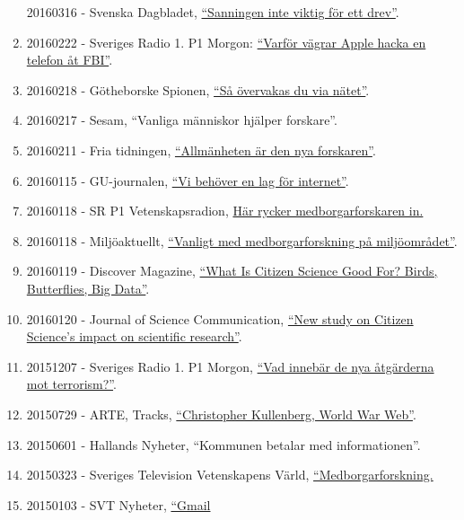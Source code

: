 \documentclass[
]{article}
\begin{document}
\begin{enumerate}
  20160316 - Svenska Dagbladet,
  \href{http://www.svd.se/sanning-inte-viktigt-for-ett-drev/om/natdrev}{``Sanningen
  inte viktig för ett drev''}.
\item
  20160222 - Sveriges Radio 1. P1 Morgon:
  \href{http://t.sr.se/1KBHSak}{``Varför vägrar Apple hacka en telefon
  åt FBI''}.
\item
  20160218 - Götheborske Spionen,
  \href{http://www.spionen.se/140-redaktionellt/reportage/feature/1593-sa-oevervakas-du-via-naetet}{``Så
  övervakas du via nätet''}.
\item
  20160217 - Sesam, ``Vanliga människor hjälper forskare''.
\item
  20160211 - Fria tidningen,
  \href{http://www.fria.nu/artikel/121724}{``Allmänheten är den nya
  forskaren''}.
\item
  20160115 - GU-journalen,
  \href{https://issuu.com/universityofgothenburg/docs/guj1-2016/32}{``Vi
  behöver en lag för internet''}.
\item
  20160118 - SR P1 Vetenskapsradion, \href{http://t.sr.se/239vggG}{Här
  rycker medborgarforskaren in.}
\item
  20160118 - Miljöaktuellt,
  \href{http://miljoaktuellt.se/vanligare-att-forskare-tar-hjalp-av-allmanheten/}{``Vanligt
  med medborgarforskning på miljöområdet''}.
\item
  20160119 - Discover Magazine,
  \href{http://blogs.discovermagazine.com/inkfish/2016/01/19/what-is-citizen-science-good-for-birds-butterflies-big-data/\#.Vp9DvPGFB24}{``What
  Is Citizen Science Good For? Birds, Butterflies, Big Data''}.
\item
  20160120 - Journal of Science Communication,
  \href{http://jcom.sissa.it/node/3076}{``New study on Citizen Science's
  impact on scientific research''}.
\item
  20151207 - Sveriges Radio 1. P1 Morgon,
  \href{http://t.sr.se/1XMYemi}{``Vad innebär de nya åtgärderna mot
  terrorism?''}.
\item
  20150729 - ARTE, Tracks,
  \href{http://tracks.arte.tv/fr/christopher-kullenberg-world-war-web}{``Christopher
  Kullenberg, World War Web''}.
\item
  20150601 - Hallands Nyheter, ``Kommunen betalar med informationen''.
\item
  20150323 - Sveriges Television Vetenskapens Värld,
  \href{https://youtu.be/vG8sZQnU7mU?t=18m1s}{``Medborgarforskning.}
\item
  20150103 - SVT Nyheter,
  \href{http://www.svt.se/nyheter/utrikes/gmail-senaste-malet-for-kinas-natcensur?cmpid=del:pd:ny:20160803:gmail-senaste-malet-for-kinas-natcensur:nyh}{``Gmail
}
\end{enumerate}
\end{document}
